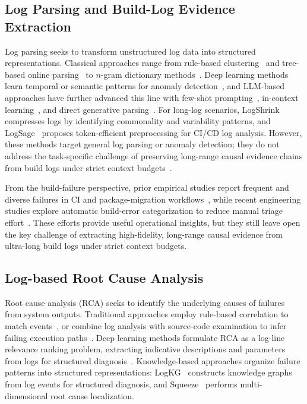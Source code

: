 \documentclass[sigconf,anonymous]{acmart}
\begin{document}
\subsection{Log Parsing and Build-Log Evidence Extraction}

Log parsing seeks to transform unstructured log data into structured representations. Classical approaches range from rule-based clustering~\cite{vaarandi2008mining} and tree-based online parsing~\cite{he2017drain} to $n$-gram dictionary methods~\cite{dai2020logram}. Deep learning methods learn temporal or semantic patterns for anomaly detection~\cite{du2017deeplog,guo2021logbert,chen2022bert,yang2021plelog}, and LLM-based approaches have further advanced this line with few-shot prompting~\cite{liu2024logprompt}, in-context learning~\cite{xu2024divlog}, and direct generative parsing~\cite{qi2023loggpt,guan2024logllm,ma2024llmparser}. For long-log scenarios, LogShrink~\cite{li2024logshrink} compresses logs by identifying commonality and variability patterns, and LogSage~\cite{xu2025logsage} proposes token-efficient preprocessing for CI/CD log analysis. However, these methods target general log parsing or anomaly detection; they do not address the task-specific challenge of preserving long-range causal evidence chains from build logs under strict context budgets~\cite{le2022log}.

From the build-failure perspective, prior empirical studies report frequent and diverse failures in CI and package-migration workflows~\cite{rausch2017empirical}, while recent engineering studies explore automatic build-error categorization to reduce manual triage effort~\cite{lee2024applying}. These efforts provide useful operational insights, but they still leave open the key challenge of extracting high-fidelity, long-range causal evidence from ultra-long build logs under strict context budgets.

\subsection{Log-based Root Cause Analysis}

Root cause analysis (RCA) seeks to identify the underlying causes of failures from system outputs. Traditional approaches employ rule-based correlation to match events~\cite{notaro2023logrule}, or combine log analysis with source-code examination to infer failing execution paths~\cite{yuan2010sherlog}. Deep learning methods formulate RCA as a log-line relevance ranking problem, extracting indicative descriptions and parameters from logs for structured diagnosis~\cite{wittkopp2024logrca}. Knowledge-based approaches organize failure patterns into structured representations: LogKG~\cite{sui2023logkg} constructs knowledge graphs from log events for structured diagnosis, and Squeeze~\cite{li2019generic} performs multi-dimensional root cause localization.
\end{document}
